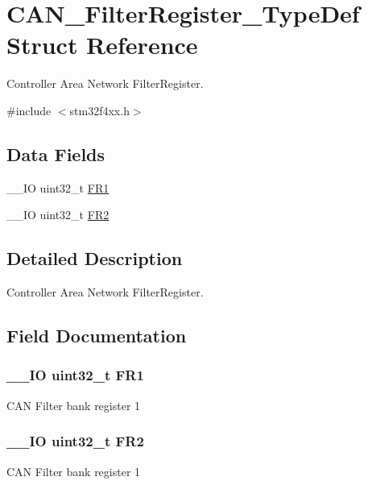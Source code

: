 \hypertarget{struct_c_a_n___filter_register___type_def}{\section{C\-A\-N\-\_\-\-Filter\-Register\-\_\-\-Type\-Def Struct Reference}
\label{struct_c_a_n___filter_register___type_def}
}


Controller Area Network Filter\-Register.  




{\ttfamily \#include $<$stm32f4xx.\-h$>$}

\subsection*{Data Fields}
\begin{DoxyCompactItemize}
\item 
\-\_\-\-\_\-\-I\-O uint32\-\_\-t \hyperlink{struct_c_a_n___filter_register___type_def_a92036953ac673803fe001d843fea508b}{F\-R1}
\item 
\-\_\-\-\_\-\-I\-O uint32\-\_\-t \hyperlink{struct_c_a_n___filter_register___type_def_a7f7d80b45b7574463d7030fc8a464582}{F\-R2}
\end{DoxyCompactItemize}


\subsection{Detailed Description}
Controller Area Network Filter\-Register. 

\subsection{Field Documentation}
\hypertarget{struct_c_a_n___filter_register___type_def_a92036953ac673803fe001d843fea508b}{
\subsubsection[{F\-R1}]{\setlength{\rightskip}{0pt plus 5cm}\-\_\-\-\_\-\-I\-O uint32\-\_\-t F\-R1}}\label{struct_c_a_n___filter_register___type_def_a92036953ac673803fe001d843fea508b}
C\-A\-N Filter bank register 1 \hypertarget{struct_c_a_n___filter_register___type_def_a7f7d80b45b7574463d7030fc8a464582}{
\subsubsection[{F\-R2}]{\setlength{\rightskip}{0pt plus 5cm}\-\_\-\-\_\-\-I\-O uint32\-\_\-t F\-R2}}\label{struct_c_a_n___filter_register___type_def_a7f7d80b45b7574463d7030fc8a464582}
C\-A\-N Filter bank register 1 

